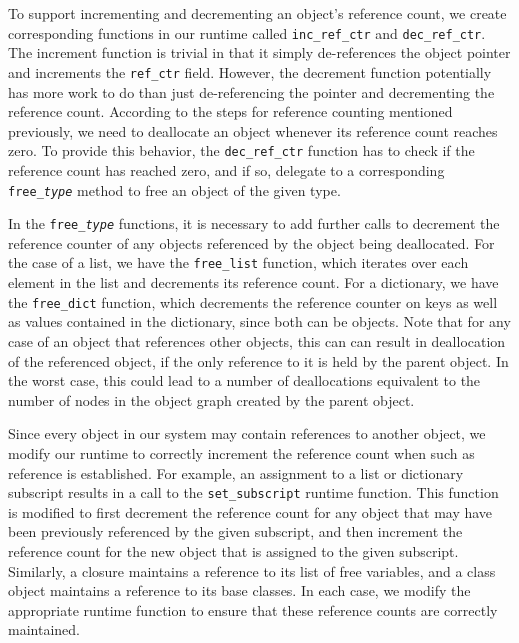 \documentclass{sigplanconf}
\begin{document}
To support incrementing and decrementing an object's reference count, we create corresponding functions in our runtime called \texttt{inc\_ref\_ctr} and \texttt{dec\_ref\_ctr}.  The increment function is trivial in that it simply de-references the object pointer and increments the \texttt{ref\_ctr} field.   However, the decrement function potentially has more work to do than just de-referencing the pointer and decrementing the reference count.  According to the steps for reference counting mentioned previously, we need to deallocate an object whenever its reference count reaches zero.  To provide this behavior, the \texttt{dec\_ref\_ctr} function has to check if the reference count has reached zero, and if so, delegate to a corresponding \texttt{free\_\textit{type}} method to free an object of the given type.

In the \texttt{free\_\textit{type}} functions, it is necessary to add further calls to decrement the reference counter of any objects referenced by the object being deallocated.  For the case of a list, we have the \texttt{free\_list} function, which iterates over each element in the list and decrements its reference count.  For a dictionary, we have the \texttt{free\_dict} function, which decrements the reference counter on keys as well as values contained in the dictionary, since both can be objects.  Note that for any case of an object that references other objects, this can can result in deallocation of the referenced object, if the only reference to it is held by the parent object.  In the worst case, this could lead to a number of deallocations equivalent to the number of nodes in the object graph created by the parent object.  

Since every object in our system may contain references to another object, we modify our runtime to correctly increment the reference count when such as reference is established.  For example, an assignment to a list or dictionary subscript results in a call to the \texttt{set\_subscript} runtime function.  This function is modified to first decrement the reference count for any object that may have been previously referenced by the given subscript, and then increment the reference count for the new object that is assigned to the given subscript.  Similarly, a closure maintains a reference to its list of free variables, and a class object maintains a reference to its base classes.  In each case, we modify the appropriate runtime function to ensure that these reference counts are correctly maintained.  
\end{document}
